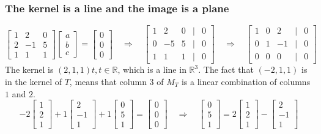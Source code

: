 \documentclass[a4paper, 9pt]{extarticle}
\begin{document}
\subsubsection{The kernel is a line and the image is a plane}
$$
  \begin{bmatrix}
    1 & 2  & 0 \\
    2 & -1 & 5 \\
    1 & 1  & 1
  \end{bmatrix}
  \begin{bmatrix}
    a \\
    b \\
    c
  \end{bmatrix}
  =
  \begin{bmatrix}
    0 \\
    0 \\
    0
  \end{bmatrix}
  \quad \Rightarrow \quad
  \begin{bmatrix}
    1 & 2  & 0 & | & 0 \\
    0 & -5 & 5 & | & 0 \\
    1 & 1  & 1 & | & 0
  \end{bmatrix}
  \quad \Rightarrow \quad
  \begin{bmatrix}
    1 & 0 & 2  & | & 0 \\
    0 & 1 & -1 & | & 0 \\
    0 & 0 & 0  & | & 0
  \end{bmatrix}
$$
The kernel is $(2, 1, 1)t, t \in \mathbb{R}$, which is a line in $\mathbb{R}^3$. The fact that $(-2, 1, 1)$ is in the kernel of $T$, means that column 3 of $M_T$ is a linear combination of columns $1$ and $2$.
$$
  -2
  \begin{bmatrix}
    1 \\
    2 \\
    1
  \end{bmatrix}
  +
  1
  \begin{bmatrix}
    2  \\
    -1 \\
    1
  \end{bmatrix}
  +
  1
  \begin{bmatrix}
    0 \\
    5 \\
    1
  \end{bmatrix}
  =
  \begin{bmatrix}
    0 \\
    0 \\
    0
  \end{bmatrix}
  \quad \Longrightarrow \quad
  \begin{bmatrix}
    0 \\
    5 \\
    1
  \end{bmatrix}
  =
  2
  \begin{bmatrix}
    1 \\
    2 \\
    1
  \end{bmatrix}
  -
  \begin{bmatrix}
    2  \\
    -1 \\
    1
  \end{bmatrix}
$$
\end{document}
